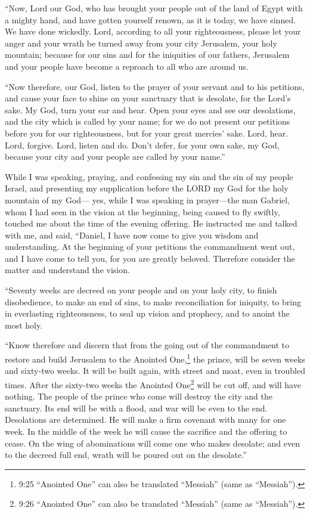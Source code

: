 \myverse{}“Now, Lord our God, who has brought your people out
of the land of Egypt with a mighty hand, and have gotten yourself renown, as it is today, we have sinned.
We have done wickedly.
\myverse{}Lord, according to all your righteousness, please let your anger and your
wrath be turned away from your city Jerusalem, your holy mountain; because for our sins and for the iniquities
of our fathers, Jerusalem and your people have become a reproach to all who are around us.

\myverse{}“Now therefore, our God, listen to the prayer of your
servant and to his petitions, and cause your face to shine on your sanctuary that is desolate, for the
Lord’s sake.
\myverse{}My God, turn your ear and hear. Open your eyes and see our desolations, and
the city which is called by your name; for we do not present our petitions before you for our righteousness,
but for your great mercies’ sake.
\myverse{}Lord, hear. Lord, forgive. Lord, listen and do. Don’t defer, for your own
sake, my God, because your city and your people are called by your name.”

\vspace{\baselineskip}

\myverse{}While I was speaking, praying, and confessing my sin and the
sin of my people Israel, and presenting my supplication before the LORD my God for the holy mountain of
my God—
\myverse{}yes, while I was speaking in prayer—the man Gabriel, whom I had seen in the
vision at the beginning, being caused to fly swiftly, touched me about the time of the evening offering.
\myverse{}He instructed me and talked with me, and said, “Daniel, I have now come to
give you wisdom and understanding.
\myverse{}At the beginning of your petitions the commandment went out, and I have come
to tell you, for you are greatly beloved. Therefore consider the matter and understand the vision.

\myverse{}“Seventy weeks are decreed on your people and on your holy city,
to finish disobedience, to make an end of sins, to make reconciliation for iniquity, to bring in everlasting
righteousness, to seal up vision and prophecy, and to anoint the most holy.

\myverse{}“Know therefore and discern that from the going out of the commandment
to restore and build Jerusalem to the Anointed One,\footnote{9:25 “Anointed One” can also be translated “Messiah” (same as “Messiah”).} the prince, will
be seven weeks and sixty-two weeks. It will be built again, with street and moat, even in troubled times.
\myverse{}After the sixty-two weeks the Anointed One\footnote{9:26 “Anointed One” can also be translated “Messiah” (same as “Messiah”).} will be cut off,
and will have nothing. The people of the prince who come will destroy the city and the sanctuary. Its
end will be with a flood, and war will be even to the end. Desolations are determined.
\myverse{}He will make a firm covenant with many for one week. In the middle of the
week he will cause the sacrifice and the offering to cease. On the wing of abominations will come one
who makes desolate; and even to the decreed full end, wrath will be poured out on the desolate.”


